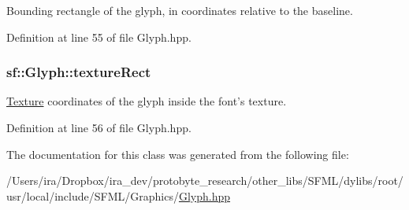 Bounding rectangle of the glyph, in coordinates relative to the baseline. 



Definition at line 55 of file Glyph.\-hpp.

\hypertarget{classsf_1_1_glyph_a0d502d326449f8c49011ed91d2805f5b}{
\subsubsection[{texture\-Rect}]{ sf\-::\-Glyph\-::texture\-Rect}}\label{classsf_1_1_glyph_a0d502d326449f8c49011ed91d2805f5b}


\hyperlink{classsf_1_1_texture}{Texture} coordinates of the glyph inside the font's texture. 



Definition at line 56 of file Glyph.\-hpp.



The documentation for this class was generated from the following file\-:\begin{DoxyCompactItemize}
\item 
/\-Users/ira/\-Dropbox/ira\-\_\-dev/protobyte\-\_\-research/other\-\_\-libs/\-S\-F\-M\-L/dylibs/root/usr/local/include/\-S\-F\-M\-L/\-Graphics/\hyperlink{_glyph_8hpp}{Glyph.\-hpp}\end{DoxyCompactItemize}
